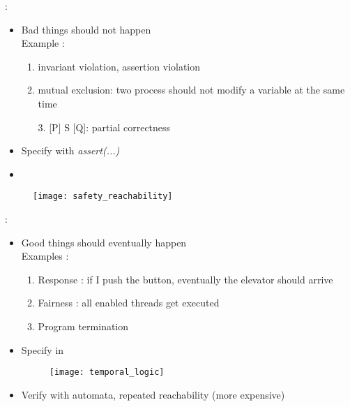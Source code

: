 \begin{minipage}[t]{0.48\textwidth}
     :
    \begin{itemize}
        \item Bad things should not happen\\
        Example :
        \begin{enumerate}
            \item invariant violation, assertion violation
            \item mutual exclusion: two process should not modify a variable at the same time
            \item[3.] [P] S [Q]: partial correctness
        \end{enumerate}
        \item Specify with \textit{assert(...)}
        \item {}    
    \end{itemize}
    \begin{figure}[H]
        \centering
        \texttt{[image: safety\_reachability]}
    \end{figure}
\end{minipage}
\hfill
\begin{minipage}[t]{0.48\textwidth}
     :
    \begin{itemize}
        \item Good things should eventually happen\\
        Examples : 
        \begin{enumerate}
            \item Response : if I push the button, eventually the elevator should arrive
            \item Fairness : all enabled threads get executed
            \item Program termination
        \end{enumerate}
        \item Specify in 
        \begin{figure}[H]
            \centering
            \texttt{[image: temporal\_logic]}
        \end{figure}
        \item Verify with automata, repeated reachability (more expensive)
    \end{itemize}
\end{minipage}

